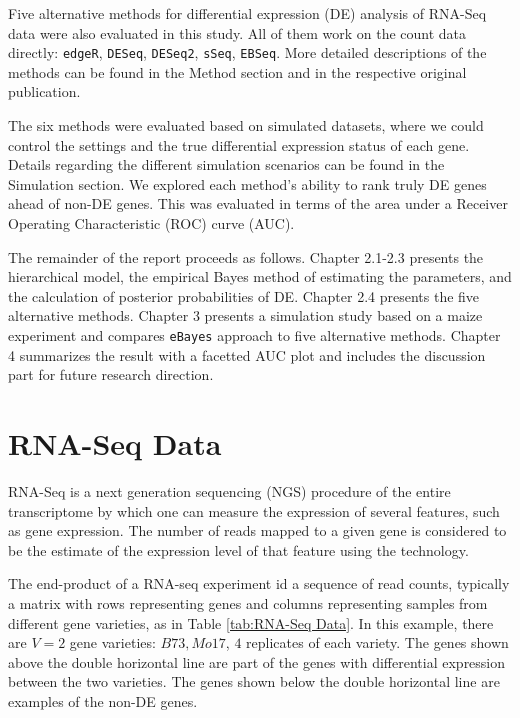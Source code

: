 Five alternative methods for differential expression (DE) analysis of RNA-Seq data were also evaluated in this study. All of them work on the count data directly: {\tt edgeR}\citep{robinson2010edger}, {\tt DESeq}\citep{anders2010differential}, {\tt DESeq2}\citep{love2014moderated}, {\tt sSeq}\citep{yu2013sseq}, {\tt EBSeq}\citep{leng2013ebseq}. More detailed descriptions of the methods can be found in the Method section and in the respective original publication. 

The six methods were evaluated based on simulated datasets, where we could control the settings and the true differential expression status of each gene. Details regarding the different simulation scenarios can be found in the Simulation section. We explored each method's ability to rank truly DE genes ahead of non-DE genes. This was evaluated in terms of the area under a Receiver Operating Characteristic (ROC) curve (AUC). 

The remainder of the report proceeds as follows. Chapter 2.1-2.3 presents the hierarchical model, the empirical Bayes method of estimating the parameters, and the calculation of posterior probabilities of DE. Chapter 2.4 presents the five alternative methods. Chapter 3 presents a simulation study based on a maize experiment and compares {\tt eBayes} approach to five alternative methods. Chapter 4 summarizes the result with a facetted AUC plot and includes the discussion part for future research direction. 



\section{RNA-Seq Data}

RNA-Seq is a next generation sequencing (NGS) procedure of the entire transcriptome by which one can measure the expression of several features, such as gene expression. The number of reads mapped to a given gene is considered to be the estimate of the expression level of that feature using the technology\citep{marioni2008rna}.

The end-product of a RNA-seq experiment id a sequence of read counts, typically a matrix with rows representing genes and columns representing samples from different gene varieties, as in Table \ref{tab:RNA-Seq Data}. In this example, there are $V=2$ gene varieties: $B73, Mo17$, $4$ replicates of each variety. The genes shown above the double horizontal line are part of the genes with differential expression between the two varieties. The genes shown below the double horizontal line are examples of the non-DE genes. 

